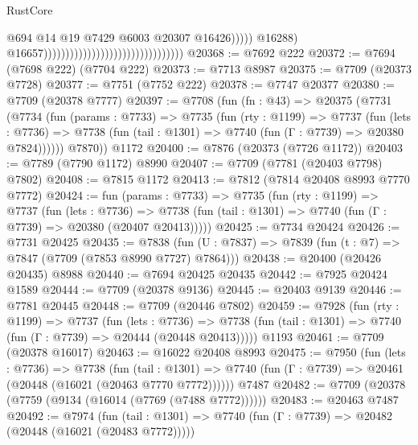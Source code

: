 \begin{lexlean}{RustCore}
\begin{coremodule}
                                                                                @694
                                                                                @14
                                                                                @19
                                                                                @7429
                                                                                @6003
                                                                                @20307
                                                                                @16426)))))
                                                                      @16288)
                                                                    @16657))))))))))))))))))))))))))))))))
@20368 := @7692 @222
@20372 := @7694 (@7698 @222) (@7704 @222)
@20373 := @7713 @8987
@20375 := @7709 (@20373 @7728)
@20377 := @7751 (@7752 @222)
@20378 := @7747 @20377
@20380 := @7709 (@20378 @7777)
@20397 := @7708
    (fun (fn : @43) =>
    @20375
      (@7731
        (@7734
          (fun (params : @7733) =>
          @7735
            (fun (rty : @1199) =>
            @7737
              (fun (lets : @7736) =>
              @7738 (fun (tail : @1301) => @7740 (fun (Γ : @7739) => @20380 @7824))))))
        @7870))
    @1172
@20400 := @7876 (@20373 (@7726 @1172))
@20403 := @7789 (@7790 @1172) @8990
@20407 := @7709 (@7781 (@20403 @7798) @7802)
@20408 := @7815 @1172
@20413 := @7812 (@7814 @20408 @8993 @7770 @7772)
@20424 := fun (params : @7733) =>
  @7735
    (fun (rty : @1199) =>
    @7737
      (fun (lets : @7736) =>
      @7738 (fun (tail : @1301) => @7740 (fun (Γ : @7739) => @20380 (@20407 @20413)))))
@20425 := @7734 @20424
@20426 := @7731 @20425
@20435 := @7838 (fun (U : @7837) => @7839 (fun (t : @7) => @7847 (@7709 (@7853 @8990 @7727) @7864)))
@20438 := @20400 (@20426 @20435) @8988
@20440 := @7694 @20425 @20435
@20442 := @7925 @20424 @1589
@20444 := @7709 (@20378 @9136)
@20445 := @20403 @9139
@20446 := @7781 @20445
@20448 := @7709 (@20446 @7802)
@20459 := @7928
    (fun (rty : @1199) =>
    @7737
      (fun (lets : @7736) =>
      @7738 (fun (tail : @1301) => @7740 (fun (Γ : @7739) => @20444 (@20448 @20413)))))
    @1193
@20461 := @7709 (@20378 @16017)
@20463 := @16022 @20408 @8993
@20475 := @7950
    (fun (lets : @7736) =>
    @7738
      (fun (tail : @1301) =>
      @7740 (fun (Γ : @7739) => @20461 (@20448 (@16021 (@20463 @7770 @7772))))))
    @7487
@20482 := @7709 (@20378 (@7759 (@9134 (@16014 (@7769 (@7488 @7772))))))
@20483 := @20463 @7487
@20492 := @7974
    (fun (tail : @1301) => @7740 (fun (Γ : @7739) => @20482 (@20448 (@16021 (@20483 @7772)))))

\end{coremodule}
\end{lexlean}
